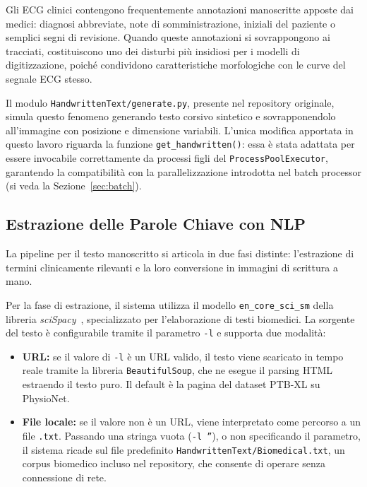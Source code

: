 Gli ECG clinici contengono frequentemente annotazioni manoscritte apposte dai medici: diagnosi abbreviate, note di somministrazione, iniziali del paziente o semplici segni di revisione. Quando queste annotazioni si sovrappongono ai tracciati, costituiscono uno dei disturbi più insidiosi per i modelli di digitizzazione, poiché condividono caratteristiche morfologiche con le curve del segnale ECG stesso.

Il modulo \texttt{HandwrittenText/generate.py}, presente nel repository originale, simula questo fenomeno generando testo corsivo sintetico e sovrapponendolo all'immagine con posizione e dimensione variabili. L'unica modifica apportata in questo lavoro riguarda la funzione \texttt{get\_handwritten()}: essa è stata adattata per essere invocabile correttamente da processi figli del \texttt{ProcessPoolExecutor}, garantendo la compatibilità con la parallelizzazione introdotta nel batch processor (si veda la Sezione~\ref{sec:batch}).

\subsection{Estrazione delle Parole Chiave con NLP}

La pipeline per il testo manoscritto si articola in due fasi distinte: l'estrazione di termini clinicamente rilevanti e la loro conversione in immagini di scrittura a mano.

Per la fase di estrazione, il sistema utilizza il modello \texttt{en\_core\_sci\_sm} della libreria \textit{sciSpacy}~\cite{neumann-etal-2019-scispacy}, specializzato per l'elaborazione di testi biomedici. La sorgente del testo è configurabile tramite il parametro \texttt{-l} e supporta due modalità:

\begin{itemize}
    \item \textbf{URL:} se il valore di \texttt{-l} è un URL valido, il testo viene scaricato in tempo reale tramite la libreria \texttt{BeautifulSoup}, che ne esegue il parsing HTML estraendo il testo puro. Il default è la pagina del dataset PTB-XL su PhysioNet.
    \item \textbf{File locale:} se il valore non è un URL, viene interpretato come percorso a un file \texttt{.txt}. Passando una stringa vuota (\texttt{-l ''}), o non specificando il parametro, il sistema ricade sul file predefinito \texttt{HandwrittenText/Biomedical.txt}, un corpus biomedico incluso nel repository, che consente di operare senza connessione di rete.
\end{itemize}

